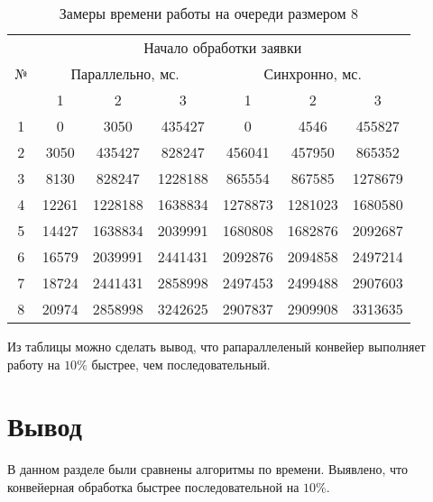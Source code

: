 \begin{table}[ht!]
	\begin{center}
		\captionsetup{justification=raggedright,singlelinecheck=off}
		\label{tbl:best}
		\begin{tabular}{|c|c|c|c|c|c|c|}
			\hline
			\multirow{3}{*}{№} & \multicolumn{6}{c|}{Начало обработки заявки} \\ \cline{2-7} 
			& \multicolumn{3}{c|}{Параллельно, мс.} & \multicolumn{3}{c|}{Синхронно, мс.} \\ \cline{2-7} 
			& 1 & 2 & 3 & 1 & 2 & 3 \\ \hline
			1   & 0          & 3050      & 435427     & 0          & 4546     & 455827      \\
			2   & 3050      & 435427     &   828247   &   456041    &  457950    &  865352  \\
			3   &   8130    &  828247    & 1228188     &   865554    &  867585   &  1278679    \\
			4   &   12261   &   1228188   &   1638834   &  1278873    &  1281023    &  1680580   \\
			5   &   14427   &  1638834    &  2039991    &  1680808   &  1682876    &  2092687    \\
			6   &   16579   &  2039991    &  2441431    &  2092876    &  2094858    &  2497214    \\
			7   &   18724   &  2441431    &   2858998   &  2497453    &  2499488   &   2907603   \\
			8   &   20974   &   2858998   &  3242625    &  2907837   &   2909908   &   3313635   \\
			\hline
		\end{tabular}
	\caption{Замеры времени работы на очереди размером 8}
	\end{center}
\end{table}

\FloatBarrier

Из таблицы можно сделать вывод, что рапараллеленый  конвейер выполняет работу на $10\%$ быстрее, чем последовательный.

\section*{Вывод}

В данном разделе были сравнены алгоритмы по времени. Выявлено, что конвейерная обработка быстрее последовательной на $10\%$.